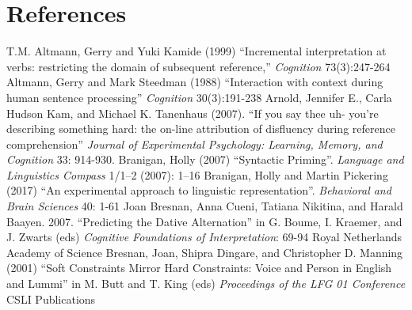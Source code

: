 \documentclass[a4paper]{article}
\begin{document}


\section*{References}

T.M. Altmann, Gerry and Yuki Kamide (1999)
``Incremental interpretation at verbs: restricting the domain of subsequent reference,''
{\it Cognition} 73(3):247-264
\newline
\newline
 Altmann, Gerry  and Mark Steedman (1988) ``Interaction with context during human sentence processing'' 
{\it Cognition} 30(3):191-238
\newline
\newline
Arnold, Jennifer E., Carla Hudson Kam, and Michael K. Tanenhaus (2007). ``If you say thee uh- you’re describing something hard: the on-line attribution of disfluency during reference comprehension'' {\it Journal of Experimental Psychology: Learning, Memory, and Cognition} 33: 914-930.
\newline
\newline
Branigan, Holly (2007) ``Syntactic Priming''.  {\it Language and Linguistics Compass} 1/1–2 (2007): 1–16
\newline
\newline
Branigan, Holly and Martin Pickering (2017) ``An experimental approach to
linguistic representation''.  {\it Behavioral and Brain Sciences} 40: 1-61
\newline
\newline
Joan Bresnan, Anna Cueni, Tatiana Nikitina, and Harald Baayen. 2007. ``Predicting the Dative Alternation'' in  G. Boume, I. Kraemer, and J. Zwarts (eds) {\it Cognitive Foundations of Interpretation}: 69-94  Royal Netherlands Academy of Science
\newline
\newline
Bresnan, Joan, Shipra Dingare, and Christopher D. Manning (2001) ``Soft Constraints Mirror Hard
Constraints: Voice and Person in English and
Lummi'' in M. Butt and T. King (eds) {\it Proceedings of the LFG 01
Conference}
CSLI
Publications
\newline
\newline
\end{document}
